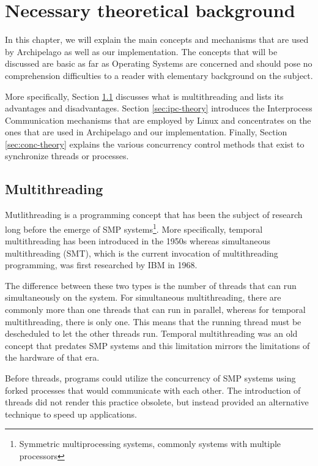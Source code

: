 \chapter{Necessary theoretical background}\label{ch:theory}

In this chapter, we will explain the main concepts and mechanisms that are used 
by Archipelago as well as our implementation. The concepts that will be 
discussed are basic as far as Operating Systems are concerned and should pose 
no comprehension difficulties to a reader with elementary background on the 
subject.

More specifically, Section \ref{sec:multi-theory} discusses what is 
multithreading and lists its advantages and disadvantages. Section 
\ref{sec:ipc-theory} introduces the Interprocess Communication mechanisms that 
are employed by Linux and concentrates on the ones that are used in Archipelago 
and our implementation. Finally, Section \ref{sec:conc-theory} explains the 
various concurrency control methods that exist to synchronize threads or 
processes.

\section{Multithreading}\label{sec:multi-theory}


Mutlithreading is a programming concept that has been the subject of research 
long before the emerge of SMP systems\footnote{
	Symmetric multiprocessing systems, commonly systems with multiple 
	processors}. More specifically, temporal multithreading has been introduced 
in the 1950s whereas simultaneous multithreading (SMT), which is the current 
invocation of multithreading programming, was first researched by IBM in 
1968\cite{mt}.

The difference between these two types is the number of threads that can run 
simultaneously on the system. For simultaneous multithreading, there are 
commonly more than one threads that can run in parallel, whereas for temporal 
multithreading, there is only one. This means that the running thread must be 
descheduled to let the other threads run. Temporal multithreading was an old 
concept that predates SMP systems and this limitation mirrors the limitations 
of the hardware of that era.

Before threads, programs could utilize the concurrency of SMP systems using 
forked processes that would communicate with each other. The introduction of 
threads did not render this practice obsolete, but instead provided an 
alternative technique to speed up applications.


